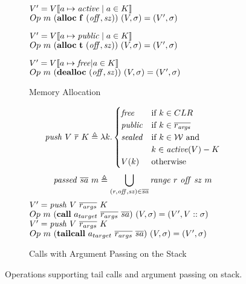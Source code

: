 \documentclass[10pt,conference]{ieeetran}%
\theoremstyle{definition}
\begin{document}
\begin{figure*}
  \begin{subfigure}{0.4\textwidth}
               {\(V' = V \llbracket a \mapsto \mathit{active} \mid a \in K \rrbracket\)}
               {\(Op ~ m ~ (\mathbf{alloc} ~ \mathbf{f} ~ (\mathit{off, sz})) ~ (V,\sigma) = (V',\sigma)\)}

               {\(V' = V \llbracket a \mapsto \mathit{public} \mid a \in K \rrbracket\)}
               {\(Op ~ m ~ (\mathbf{alloc} ~ \mathbf{t} ~ (\mathit{off, sz})) ~ (V,\sigma) = (V',\sigma)\)}
    
               {\(V' = V \llbracket a \mapsto \mathit{free} | a \in K \rrbracket\)}
               {\(Op ~ m ~ (\mathbf{dealloc} ~ (\mathit{off, sz})) ~ (V,\sigma) = (V',\sigma)\)}

    \caption{Memory Allocation}
    \label{sfig:publicalloc}
  \end{subfigure}
  \begin{subfigure}{0.6\textwidth}
    \[\mathit{push} ~ V ~ \overline{r} ~ K \triangleq \lambda k .
    \begin{cases}
      \mathit{free} & \textnormal{if } k \in CLR \\
      \mathit{public} & \textnormal{if } k \in \overline{r_{\mathit{args}}} \\
      \mathit{sealed} & \textnormal{if } k \in {\mathcal W} \textnormal{ and } \\
      & k \in \mathit{active}(V) - K \\
      V(k) & \textnormal{otherwise} \\
    \end{cases}      
    \]
    \[\mathit{passed} ~ \overline{sa} ~ m \triangleq \bigcup_{(r,\mathit{off},\mathit{sz}) \in \overline{sa}}
    \mathit{range} ~ r ~ \mathit{off} ~ \mathit{sz} ~ m\]
        {\(V' = \mathit{push} ~ V ~ \overline{r_{args}} ~ K\)}
        {\(Op ~ m ~ (\mathbf{call} ~ a_{target} ~ \overline{r_{args}} ~ \overline{sa})
          ~ (V,\sigma) = (V',V::\sigma)\)}
        {\(V' = \mathit{push} ~ V ~ \overline{r_{args}} ~ K\)}
        {\(Op ~ m ~ (\mathbf{tail call} ~ a_{target} ~ \overline{r_{args}} ~ \overline{sa})
          ~ (V,\sigma) = (V',\sigma)\)}

    \caption{Calls with Argument Passing on the Stack}
    \label{sfig:stkargs}
  \end{subfigure}
  \caption{Operations supporting tail calls and argument passing on stack.}
  \label{fig:advops}
\end{figure*}
\end{document}
